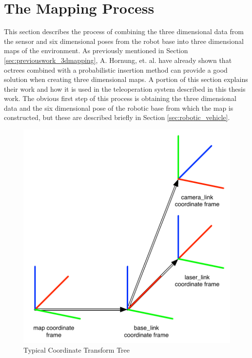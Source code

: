 \documentclass[12pt]{report}
\begin{document}
\section{The Mapping Process}
\label{sec:3dmapping}
This section describes the process of combining the three dimensional data from the sensor and six dimensional poses from the robot base into three dimensional maps of the environment. As previously mentioned in Section \ref{sec:previouswork_3dmapping}, A. Hornung, et. al. have already shown that octrees combined with a probabilistic insertion method can provide a good solution when creating three dimensional maps. A portion of this section explains their work and how it is used in the teleoperation system described in this thesis work.\cite{octomap} The obvious first step of this process is obtaining the three dimensional data and the six dimensional pose of the robotic base from which the map is constructed, but these are described briefly in Section \ref{sec:robotic_vehicle}.

\begin{figure}[ht]
  \centering
  \includegraphics[width=5in,keepaspectratio]{transforms.pdf}
  \caption{Typical Coordinate Transform Tree}
  \label{fig:transforms}
\end{figure}
\end{document}
